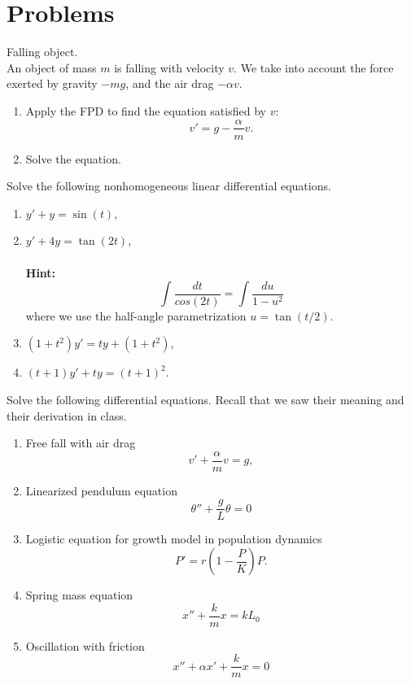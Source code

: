 \section{Problems}

\begin{Pb}
Falling object.\\

An object of mass $m$ is falling with velocity $v$. We take into account the force exerted by gravity $-mg$, and the air drag $-\alpha v$. 
\begin{enumerate}
\item Apply the FPD to find the equation satisfied by $v$: \[v' = g-\frac{\alpha}{m}v.\]
\item Solve the equation.
\end{enumerate}
\end{Pb}

\begin{Pb}
Solve the following nonhomogeneous linear differential equations.
\begin{enumerate}
\item $y' + y = \sin(t)$,
\item $y' + 4y = \tan(2t)$, \\
\ \\
\textbf{Hint:} \[\int \frac{dt}{cos(2t)} = \int\frac{du}{1-u^2}\]
where we use the half-angle parametrization $u = \tan (t/2) $.
\item $(1+t^2 ) y' = ty + (1+t^2)$,
\item $(t+1) y' + ty = (t+1)^2$.
\end{enumerate}
\end{Pb}

\begin{Pb} 
Solve the following differential equations. Recall that we saw their meaning and their derivation in class.
\begin{enumerate}
\item Free fall with air drag
\[v' + \frac{\alpha}{m} v = g,\]
\item Linearized pendulum equation
\[\theta'' + \frac{g}{L}\theta = 0\]
\item Logistic equation for growth model in population dynamics
\[P' = r(1-\frac{P}{K}) P. \]
\item Spring mass equation
\[x'' + \frac{k}{m}x = k L_0\]
\item Oscillation with friction
\[x'' +\alpha x'+ \frac{k}{m}x = 0 \]
\end{enumerate}
\end{Pb}

